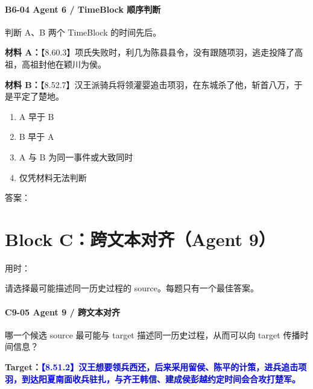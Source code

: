 \documentclass[fontset=none,11pt,a4paper]{ctexart}
\newcommand{\answerline}[1]{\underline{\hspace{#1}}}
\newcommand{\blocktime}{\vspace{0.25em}\noindent 用时：\answerline{4cm}\par\vspace{0.6em}}
\begin{document}
\paragraph{B6-04 \quad Agent 6 / TimeBlock 顺序判断}
判断 A、B 两个 TimeBlock 的时间先后。


\textbf{材料 A：}【8.60.3】项氏失败时，利几为陈县县令，没有跟随项羽，逃走投降了高祖，高祖封他在颖川为侯。

\textbf{材料 B：}【8.52.7】汉王派骑兵将领灌婴追击项羽，在东城杀了他，斩首八万，于是平定了楚地。


\begin{enumerate}[label=\Alph*.]
  \item A 早于 B
  \item B 早于 A
  \item A 与 B 为同一事件或大致同时
  \item 仅凭材料无法判断
\end{enumerate}
答案：\answerline{2.2cm}


\newpage
\section{Block C：跨文本对齐（Agent 9）}
\blocktime
请选择最可能描述同一历史过程的 source。每题只有一个最佳答案。

\paragraph{C9-05 \quad Agent 9 / 跨文本对齐}
哪一个候选 source 最可能与 target 描述同一历史过程，从而可以向 target 传播时间信息？

\textbf{Target：}\textcolor{blue}{\textbf{【8.51.2】汉王想要领兵西还，后来采用留侯、陈平的计策，进兵追击项羽，到达阳夏南面收兵驻扎，与齐王韩信、建成侯彭越约定时间会合攻打楚军。}}
\end{document}
